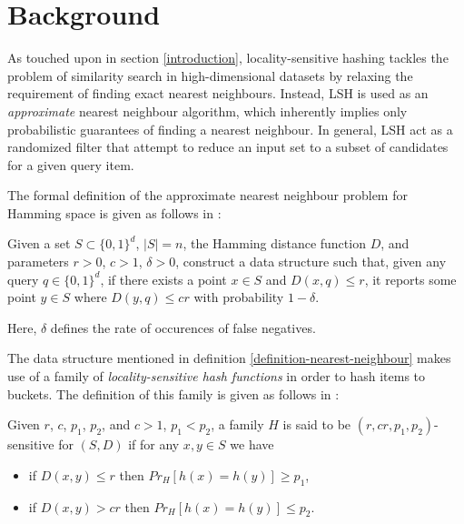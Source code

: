 \section{Background}
\label{background}

As touched upon in section \ref{introduction}, locality-sensitive hashing tackles the problem of similarity search in high-dimensional datasets by relaxing the requirement of finding exact nearest neighbours. Instead, LSH is used as an \textit{approximate} nearest neighbour algorithm, which inherently implies only probabilistic guarantees of finding a nearest neighbour. In general, LSH act as a randomized filter that attempt to reduce an input set to a subset of candidates for a given query item.

The formal definition of the approximate nearest neighbour problem for Hamming space is given as follows in \cite{DBLP:journals/corr/PhamP16}:

\begin{definition}
\label{definition-nearest-neighbour}
  Given a set $S \subset \{0, 1\}^d$, $|S| = n$, the Hamming distance function $D$, and parameters $r > 0$, $c > 1$, $\delta > 0$, construct a data structure such that, given any query $q \in \{0,1\}^d$, if there exists a point $x \in S$ and $D(x, q) \leq r$, it reports some point $y \in S$ where $D(y, q) \leq cr$ with probability $1 - \delta$.
\end{definition}

Here, $\delta$ defines the rate of occurences of false negatives.

The data structure mentioned in definition \ref{definition-nearest-neighbour} makes use of a family of \textit{locality-sensitive hash functions} in order to hash items to buckets. The definition of this family is given as follows in \cite{DBLP:conf/stoc/IndykM98}:

\begin{definition}
\label{definition-hash-functions}
  Given $r$, $c$, $p_1$, $p_2$, and $c > 1$, $p_1 < p_2$, a family $H$ is said to be $(r, cr, p_1, p_2)$-sensitive for $(S, D)$ if for any $x, y \in S$ we have

  \begin{itemize}
    \item if $D(x, y) \leq r$ then $Pr_H [h(x) = h(y)] \geq p_1$,
    \item if $D(x, y) > cr$ then $Pr_H [h(x) = h(y)] \leq p_2$.
  \end{itemize}
\end{definition}

